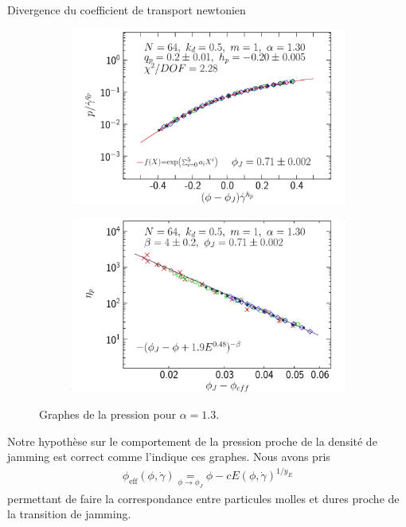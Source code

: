 \documentclass{beamer}
\begin{document}
\begin{frame}{Divergence du coefficient de transport newtonien}

\begin{figure}[h!]
\centering
    \begin{subfigure}[t]{0.49\textwidth}
        \centering
        \includegraphics[width=\textwidth]{figures/figs/p-dphi-scale_0064_KDk500_Ml100_EL130}
    \end{subfigure}
    \hfill
    \begin{subfigure}[t]{0.49\textwidth}
        \centering
        \includegraphics[width=\textwidth]{figures/figs/etap-phieff_graph_0064_KDk500_Ml100_EL130}
    \end{subfigure}
    \caption{Graphes de la pression pour $\alpha=1.3$.}
\end{figure}
\vspace{-10pt}
Notre hypothèse sur le comportement de la pression proche de la densité de jamming est correct comme l’indique ces graphes. Nous avons pris
\begin{align*}
\phi_{\text{eff}}(\phi,\dot{\gamma})\operatorname*{~=~}_{\phi\rightarrow\phi_J}\phi-cE(\phi,\dot{\gamma})^{1/y_E}
\end{align*}
permettant de faire la correspondance entre particules molles et dures proche de la transition de jamming.

\end{frame}
\end{document}
